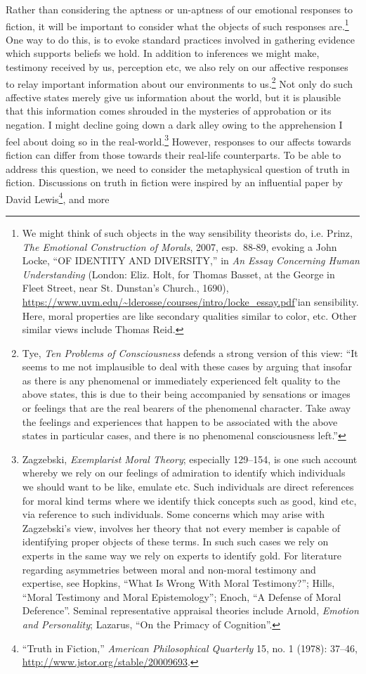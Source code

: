 \documentclass[phdthesis,12pt,final,a4paper]{wuthesis}
\theoremstyle{definition}
\theoremstyle{definition}
\theoremstyle{definition}
\theoremstyle{definition}
\theoremstyle{remark}
\begin{document}
Rather than considering the aptness or un-aptness of our emotional responses to fiction, it will be important to consider what the objects of such responses are.\footnote{We might think of such objects in the way sensibility theorists do, i.e. Prinz, \emph{The {Emotional Construction} of {Morals}}, 2007, esp.~88-89, evoking a John Locke, {``{OF IDENTITY AND DIVERSITY},''} in \emph{An {Essay Concerning Human Understanding}} (London: Eliz. Holt, for Thomas Basset, at the George in Fleet Street, near St. Dunstan's Church., 1690), \url{https://www.uvm.edu/~lderosse/courses/intro/locke_essay.pdf}'ian sensibility. Here, moral properties are like secondary qualities similar to color, etc. Other similar views include Thomas Reid.} One way to do this, is to evoke standard practices involved in gathering evidence which supports beliefs we hold. In addition to inferences we might make, testimony received by us, perception etc, we also rely on our affective responses to relay important information about our environments to us.\footnote{Tye, \emph{Ten {Problems} of {Consciousness} } defends a strong version of this view: ``It seems to me not implausible to deal with these cases by arguing that insofar as there is any phenomenal or immediately experienced felt quality to the above states, this is due to their being accompanied by sensations or images or feelings that are the real bearers of the phenomenal character. Take away the feelings and experiences that happen to be associated with the above states in particular cases, and there is no phenomenal consciousness left.''} Not only do such affective states merely give us information about the world, but it is plausible that this information comes shrouded in the mysteries of approbation or its negation. I might decline going down a dark alley owing to the apprehension I feel about doing so in the real-world.\footnote{Zagzebski, \emph{Exemplarist {Moral Theory}}; especially 129--154, is one such account whereby we rely on our feelings of admiration to identify which individuals we should want to be like, emulate etc. Such individuals are direct references for moral kind terms where we identify thick concepts such as good, kind etc, via reference to such individuals. Some concerns which may arise with Zagzebski's view, involves her theory that not every member is capable of identifying proper objects of these terms. In such such cases we rely on experts in the same way we rely on experts to identify gold. For literature regarding asymmetries between moral and non-moral testimony and expertise, see Hopkins, {``What {Is Wrong With Moral Testimony}?''}; Hills, {``Moral Testimony and Moral Epistemology''}; Enoch, {``A {Defense} of {Moral Deference}''}. Seminal representative appraisal theories include Arnold, \emph{Emotion and {Personality}}; Lazarus, {``On the {Primacy} of {Cognition}''}.} However, responses to our affects towards fiction can differ from those towards their real-life counterparts. To be able to address this question, we need to consider the metaphysical question of truth in fiction. Discussions on truth in fiction were inspired by an influential paper by David Lewis\footnote{{``Truth in {Fiction},''} \emph{American Philosophical Quarterly} 15, no. 1 (1978): 37--46, \url{http://www.jstor.org/stable/20009693}.}, and more 
\end{document}
